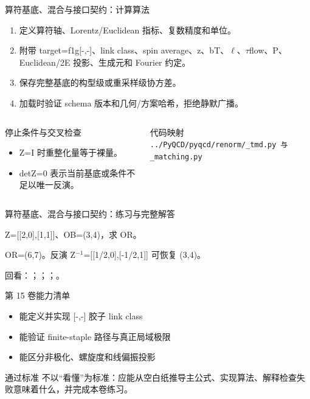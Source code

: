\begin{frame}[t]{算符基底、混合与接口契约：计算算法}
\footnotesize
{}\begin{enumerate}
\item 定义算符轴、Lorentz/\allowbreak{}Euclidean 指标、复数精度和单位。
\item 附带 target=f1g[-,-]、link class、spin average、z、bT、\ensuremath{\ell}、\ensuremath{\tau}flow、P、Euclidean/\allowbreak{}2E 投影、生成元和 Fourier 约定。
\item 保存完整基底的构型级或重采样级协方差。
\item 加载时验证 schema 版本和几何/\allowbreak{}方案哈希，拒绝静默广播。
\end{enumerate}\begin{columns}[T,onlytextwidth]
\begin{block}{停止条件与交叉检查}\scriptsize\begin{itemize}
\item[\CheckMark] Z=I 时重整化量等于裸量。
\item[\CheckMark] detZ=0 表示当前基底或条件不足以唯一反演。
\end{itemize}\end{block}
\begin{block}{代码映射}
\scriptsize \texttt{.\allowbreak{}.\allowbreak{}/\allowbreak{}PyQCD/\allowbreak{}pyqcd/\allowbreak{}renorm/\allowbreak{}\_\allowbreak{}tmd.\allowbreak{}py 与 \_\allowbreak{}matching.\allowbreak{}py}
\end{block}\end{columns}\end{frame}

\begin{frame}[t]{算符基底、混合与接口契约：练习与完整解答}
\footnotesize
\begin{block}{}Z=[[2,0],[1,1]]、OB=(3,4)，求 OR。\end{block}
\begin{exampleblock}{}OR=(6,7)。反演 Z\ensuremath{^{-1}}=[[1/\allowbreak{}2,0],[-1/\allowbreak{}2,1]] 可恢复 (3,4)。\end{exampleblock}
\vfill
\scriptsize 回看：；；；。
\end{frame}

\begin{frame}[t]{第 15 卷能力清单}
\small\begin{itemize}
\item[\CheckMark] 能定义并实现 [-,-] 胶子 link class
\item[\CheckMark] 能验证 finite-staple 路径与真正局域极限
\item[\CheckMark] 能区分非极化、螺旋度和线偏振投影
\end{itemize}\vfill\begin{block}{通过标准}
不以“看懂”为标准：应能从空白纸推导主公式、实现算法、解释检查失败意味着什么，并完成本卷练习。
\end{block}\end{frame}

